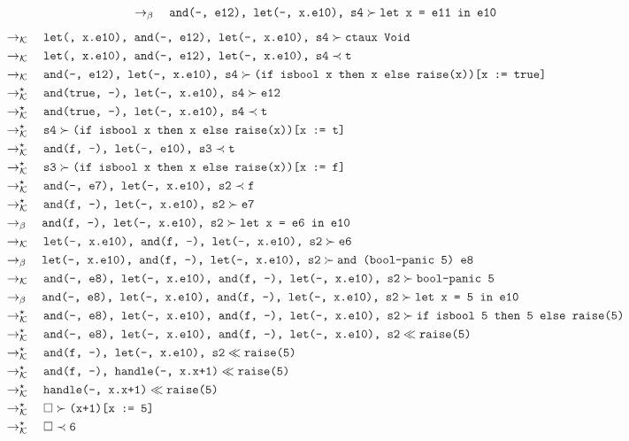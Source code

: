 \documentclass{article}
\newcommand{\tx}[1]{\textcolor{Black} {\texttt{#1}}}
\newcommand{\es}{$\square$}
\newcommand{\pop}[2]{ \tx{#1} \succ \tx{#2}}
\newcommand{\push}[2]{ \tx{#1} \prec \tx{#2}}
\newcommand{\prop}[2]{\tx{#1} \ll \tx{#2}}
\newcommand{\kr}{\rightarrow_{\mathcal{K}} \quad}
\newcommand{\br}{\rightarrow_{\beta} \quad}
\newcommand{\krs}{\rightarrow_{\mathcal{K}}^{\star} \quad}
\begin{document}
\begin{enumerate}
\begin{align*}
        &\br \pop{and(-, e12), let(-, x.e10), s4}{let x = e11 in e10}\\
    \end{align*}
    \begin{align*}
        &\kr \pop{let(, x.e10), and(-, e12), let(-, x.e10), s4}{ctaux Void}\\
        &\kr \push{let(, x.e10), and(-, e12), let(-, x.e10), s4}{t}\\
        &\kr \pop{and(-, e12), let(-, x.e10), s4}{(if isbool x then x else raise(x))[x := true]}\\
        &\krs \pop{and(true, -), let(-, x.e10), s4}{e12}\\
        &\krs \push{and(true, -), let(-, x.e10), s4}{t}\\
        &\krs \pop{s4}{(if isbool x then x else raise(x))[x := t]}\\
        &\krs \push{and(f, -), let(-, e10), s3}{t}\\
        &\krs \pop{s3}{(if isbool x then x else raise(x))[x := f]}\\
        &\krs \push{and(-, e7), let(-, x.e10), s2}{f}\\
        &\krs \pop{and(f, -), let(-, x.e10), s2}{e7}\\
        &\br \pop{and(f, -), let(-, x.e10), s2}{let x = e6 in e10}\\
        &\kr \pop{let(-, x.e10), and(f, -), let(-, x.e10), s2}{e6}\\
        &\br \pop{let(-, x.e10), and(f, -), let(-, x.e10), s2}{and (bool-panic 5) e8}\\
        &\kr \pop{and(-, e8), let(-, x.e10), and(f, -), let(-, x.e10), s2}{bool-panic 5}\\
        &\br \pop{and(-, e8), let(-, x.e10), and(f, -), let(-, x.e10), s2}{let x = 5 in e10}\\
        &\krs \pop{and(-, e8), let(-, x.e10), and(f, -), let(-, x.e10), s2}{if isbool 5 then 5 else raise(5)}\\
        &\krs \prop{and(-, e8), let(-, x.e10), and(f, -), let(-, x.e10), s2}{raise(5)}\\
        &\krs \prop{and(f, -), let(-, x.e10), s2}{raise(5)}\\
        &\krs \prop{and(f, -), handle(-, x.x+1)}{raise(5)}\\
        &\krs \prop{handle(-, x.x+1)}{raise(5)}\\
        &\krs \pop{\es}{(x+1)[x := 5]}\\
        &\krs \push{\es}{6}
        \end{align*}


\end{enumerate}
\end{document}
